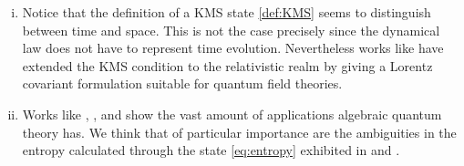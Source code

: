 \begin{enumerate}[(i)]
\item Notice that the definition of a KMS state \ref{def:KMS} seems to distinguish between time and space. This is not the case precisely since the dynamical law does not have to represent time evolution. Nevertheless works like \cite{Bros1994} have extended the KMS condition to the relativistic realm by giving a Lorentz covariant formulation suitable for quantum field theories.

\item Works like  \cite{Reyes2013}, \cite{Balachandran2013c}, and \cite{Balachandran2013} show the vast amount of applications algebraic quantum theory has. We think that of particular importance are the ambiguities in the entropy calculated through the state \ref{eq:entropy} exhibited in \cite{Balachandran2013b} and \cite{Balachandran2013a}.

\end{enumerate}
